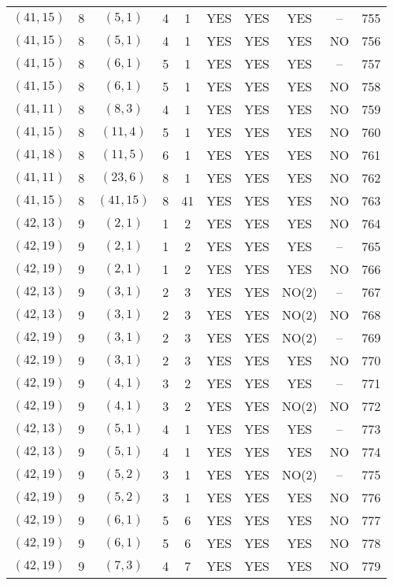 \begin{longtable}{|c|c|c|c|c|c|c|c|c|c|}
$(41, 15)$ & 8 & $(5, 1)$ & 4 & 1 & YES & YES & YES & -- & 755\\
$(41, 15)$ & 8 & $(5, 1)$ & 4 & 1 & YES & YES & YES & NO & 756\\
$(41, 15)$ & 8 & $(6, 1)$ & 5 & 1 & YES & YES & YES & -- & 757\\
$(41, 15)$ & 8 & $(6, 1)$ & 5 & 1 & YES & YES & YES & NO & 758\\
$(41, 11)$ & 8 & $(8, 3)$ & 4 & 1 & YES & YES & YES & NO & 759\\
$(41, 15)$ & 8 & $(11, 4)$ & 5 & 1 & YES & YES & YES & NO & 760\\
$(41, 18)$ & 8 & $(11, 5)$ & 6 & 1 & YES & YES & YES & NO & 761\\
$(41, 11)$ & 8 & $(23, 6)$ & 8 & 1 & YES & YES & YES & NO & 762\\
$(41, 15)$ & 8 & $(41, 15)$ & 8 & 41 & YES & YES & YES & NO & 763\\
$(42, 13)$ & 9 & $(2, 1)$ & 1 & 2 & YES & YES & YES & NO & 764\\
$(42, 19)$ & 9 & $(2, 1)$ & 1 & 2 & YES & YES & YES & -- & 765\\
$(42, 19)$ & 9 & $(2, 1)$ & 1 & 2 & YES & YES & YES & NO & 766\\
$(42, 13)$ & 9 & $(3, 1)$ & 2 & 3 & YES & YES & NO(2) & -- & 767\\
$(42, 13)$ & 9 & $(3, 1)$ & 2 & 3 & YES & YES & NO(2) & NO & 768\\
$(42, 19)$ & 9 & $(3, 1)$ & 2 & 3 & YES & YES & NO(2) & -- & 769\\
$(42, 19)$ & 9 & $(3, 1)$ & 2 & 3 & YES & YES & YES & NO & 770\\
$(42, 19)$ & 9 & $(4, 1)$ & 3 & 2 & YES & YES & YES & -- & 771\\
$(42, 19)$ & 9 & $(4, 1)$ & 3 & 2 & YES & YES & NO(2) & NO & 772\\
$(42, 13)$ & 9 & $(5, 1)$ & 4 & 1 & YES & YES & YES & -- & 773\\
$(42, 13)$ & 9 & $(5, 1)$ & 4 & 1 & YES & YES & YES & NO & 774\\
$(42, 19)$ & 9 & $(5, 2)$ & 3 & 1 & YES & YES & NO(2) & -- & 775\\
$(42, 19)$ & 9 & $(5, 2)$ & 3 & 1 & YES & YES & YES & NO & 776\\
$(42, 19)$ & 9 & $(6, 1)$ & 5 & 6 & YES & YES & YES & NO & 777\\
$(42, 19)$ & 9 & $(6, 1)$ & 5 & 6 & YES & YES & YES & NO & 778\\
$(42, 19)$ & 9 & $(7, 3)$ & 4 & 7 & YES & YES & YES & NO & 779\\

\end{longtable}
